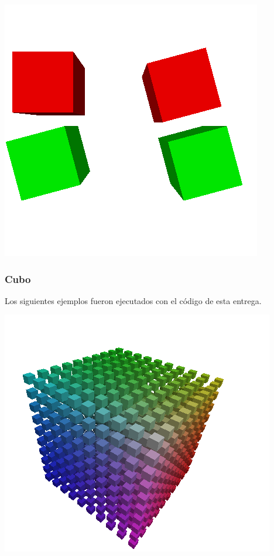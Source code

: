 \centerline{\includegraphics[scale=0.40]{../imagenes/eg11_nuevo.png}}

\newpage
\subsubsection{Cubo}

Los siguientes ejemplos fueron ejecutados con el c\'odigo de esta entrega.\\


\centerline{\includegraphics[scale=0.40]{../imagenes/eg22.png}}

